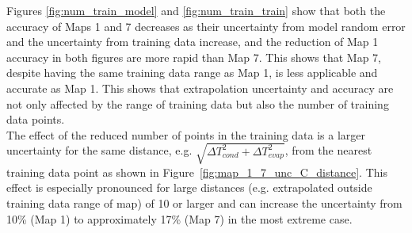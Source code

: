 Figures \ref{fig:num_train_model} and \ref{fig:num_train_train} show that both the accuracy of Maps 1 and 7 decreases as their uncertainty from model random error and the uncertainty from training data increase, and the reduction of Map 1 accuracy in both figures are more rapid than Map 7. This shows that Map 7, despite having the same training data range as Map 1, is less applicable and accurate as Map 1. This shows that extrapolation uncertainty and accuracy are not only affected by the range of training data but also the number of training data points.\\

The effect of the reduced number of points in the training data is a larger uncertainty for the same distance, e.g. $\sqrt{\Delta T_{cond}^2 + \Delta T_{evap}^2}$, from the nearest training data point as shown in Figure~\ref{fig:map_1_7_unc_C_distance}.  This effect is especially pronounced for large distances (e.g. extrapolated outside training data range of map) of 10\dgC{} or larger and can increase the uncertainty from 10\% (Map 1) to approximately 17\% (Map 7) in the most extreme case.


